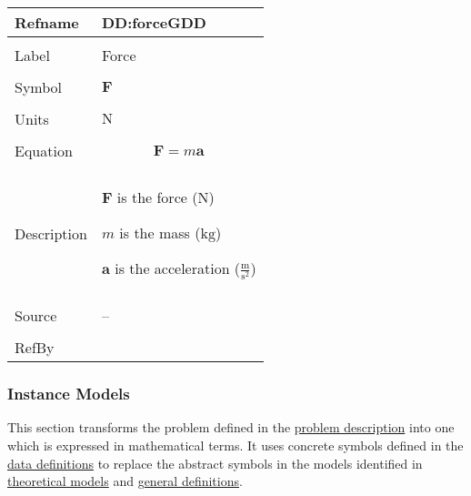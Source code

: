 \documentclass[12pt]{article}
\begin{document}
\vspace{\baselineskip}
\noindent
\begin{minipage}{\textwidth}
\begin{tabular}{>{\raggedright}p{}>{\raggedright\arraybackslash}p{}}
\toprule \textbf{Refname} & \textbf{DD:forceGDD}
\label{DD:forceGDD}
\\ \midrule \\
Label & Force
        
\\ \midrule \\
Symbol & $\symbf{F}$
         
\\ \midrule \\
Units & ${\text{N}}$
        
\\ \midrule \\
Equation & \begin{displaymath}
           \symbf{F}=m \symbf{a}
           \end{displaymath}
\\ \midrule \\
Description & \begin{symbDescription}
              \item{$\symbf{F}$ is the force (${\text{N}}$)}
              \item{$m$ is the mass (${\text{kg}}$)}
              \item{$\symbf{a}$ is the acceleration ($\frac{\text{m}}{\text{s}^{2}}$)}
              \end{symbDescription}
\\ \midrule \\
Source & --
         
\\ \midrule \\
RefBy & 
\\ \bottomrule
\end{tabular}
\end{minipage}

\subsubsection{Instance Models}
\label{Sec:IMs}
This section transforms the problem defined in the \hyperref[Sec:ProbDesc]{problem description} into one which is expressed in mathematical terms. It uses concrete symbols defined in the \hyperref[Sec:DDs]{data definitions} to replace the abstract symbols in the models identified in \hyperref[Sec:TMs]{theoretical models} and \hyperref[Sec:GDs]{general definitions}.
\end{document}
